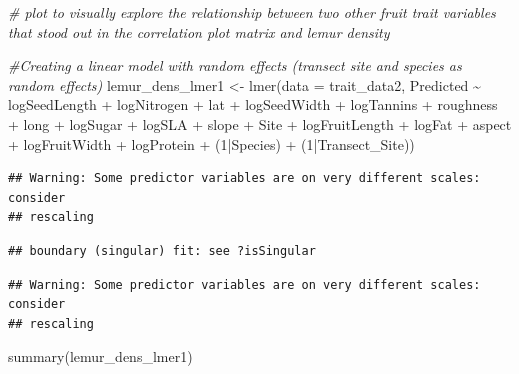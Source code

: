 \documentclass[
  12pt,
]{article}
\newenvironment{Shaded}{\begin{snugshade}}{\end{snugshade}}
\newcommand{\AttributeTok}[1]{\textcolor[rgb]{0.77,0.63,0.00}{#1}}
\newcommand{\CommentTok}[1]{\textcolor[rgb]{0.56,0.35,0.01}{\textit{#1}}}
\newcommand{\DecValTok}[1]{\textcolor[rgb]{0.00,0.00,0.81}{#1}}
\newcommand{\FunctionTok}[1]{\textcolor[rgb]{0.00,0.00,0.00}{#1}}
\newcommand{\NormalTok}[1]{#1}
\newcommand{\OtherTok}[1]{\textcolor[rgb]{0.56,0.35,0.01}{#1}}
\newcommand{\SpecialCharTok}[1]{\textcolor[rgb]{0.00,0.00,0.00}{#1}}
\begin{document}
\begin{Shaded}
\begin{Highlighting}[]
\CommentTok{\# plot to visually explore the relationship between two other fruit trait variables that stood out in the correlation plot matrix and lemur density}

\CommentTok{\#Creating a linear model with random effects (transect site and species as random effects)}
\NormalTok{lemur\_dens\_lmer1 }\OtherTok{\textless{}{-}} \FunctionTok{lmer}\NormalTok{(}\AttributeTok{data =}\NormalTok{ trait\_data2, Predicted }\SpecialCharTok{\textasciitilde{}}\NormalTok{ logSeedLength }\SpecialCharTok{+}\NormalTok{ logNitrogen }\SpecialCharTok{+}\NormalTok{ lat }\SpecialCharTok{+}\NormalTok{ logSeedWidth }\SpecialCharTok{+}\NormalTok{ logTannins }\SpecialCharTok{+}\NormalTok{ roughness }\SpecialCharTok{+}\NormalTok{ long }\SpecialCharTok{+}\NormalTok{ logSugar }\SpecialCharTok{+}\NormalTok{ logSLA }\SpecialCharTok{+}\NormalTok{ slope }\SpecialCharTok{+}\NormalTok{ Site }\SpecialCharTok{+}\NormalTok{ logFruitLength }\SpecialCharTok{+}\NormalTok{ logFat }\SpecialCharTok{+}\NormalTok{ aspect }\SpecialCharTok{+}\NormalTok{ logFruitWidth }\SpecialCharTok{+}\NormalTok{ logProtein }\SpecialCharTok{+}\NormalTok{ (}\DecValTok{1}\SpecialCharTok{|}\NormalTok{Species) }\SpecialCharTok{+}\NormalTok{ (}\DecValTok{1}\SpecialCharTok{|}\NormalTok{Transect\_Site))}
\end{Highlighting}
\end{Shaded}

\begin{verbatim}
## Warning: Some predictor variables are on very different scales: consider
## rescaling
\end{verbatim}

\begin{verbatim}
## boundary (singular) fit: see ?isSingular
\end{verbatim}

\begin{verbatim}
## Warning: Some predictor variables are on very different scales: consider
## rescaling
\end{verbatim}

\begin{Shaded}
\begin{Highlighting}[]
\FunctionTok{summary}\NormalTok{(lemur\_dens\_lmer1)}
\end{Highlighting}
\end{Shaded}
\end{document}
